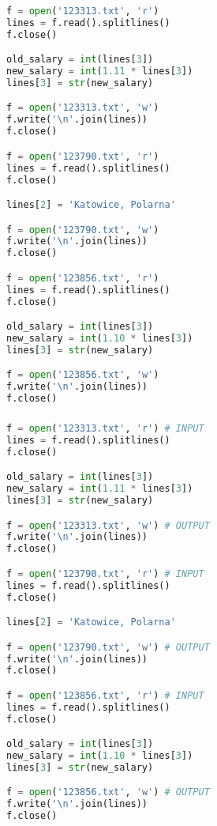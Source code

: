 \documentclass[aspectratio=169]{beamer}
\begin{document}
\begin{frame}[fragile]
\frametitle{}
\begin{lstlisting}[basicstyle=\tiny,language=python]
f = open('123313.txt', 'r')
lines = f.read().splitlines()
f.close()

old_salary = int(lines[3])
new_salary = int(1.11 * lines[3])
lines[3] = str(new_salary)

f = open('123313.txt', 'w')
f.write('\n'.join(lines))
f.close()

f = open('123790.txt', 'r')
lines = f.read().splitlines()
f.close()

lines[2] = 'Katowice, Polarna'

f = open('123790.txt', 'w')
f.write('\n'.join(lines))
f.close()

f = open('123856.txt', 'r')
lines = f.read().splitlines()
f.close()

old_salary = int(lines[3])
new_salary = int(1.10 * lines[3])
lines[3] = str(new_salary)

f = open('123856.txt', 'w')
f.write('\n'.join(lines))
f.close()
\end{lstlisting}
\end{frame}

\begin{frame}[fragile]
\frametitle{}
\begin{lstlisting}[basicstyle=\tiny,language=python]
f = open('123313.txt', 'r') # INPUT
lines = f.read().splitlines()
f.close()

old_salary = int(lines[3])
new_salary = int(1.11 * lines[3])
lines[3] = str(new_salary)

f = open('123313.txt', 'w') # OUTPUT
f.write('\n'.join(lines))
f.close()

f = open('123790.txt', 'r') # INPUT
lines = f.read().splitlines()
f.close()

lines[2] = 'Katowice, Polarna'

f = open('123790.txt', 'w') # OUTPUT
f.write('\n'.join(lines))
f.close()

f = open('123856.txt', 'r') # INPUT
lines = f.read().splitlines()
f.close()

old_salary = int(lines[3])
new_salary = int(1.10 * lines[3])
lines[3] = str(new_salary)

f = open('123856.txt', 'w') # OUTPUT
f.write('\n'.join(lines))
f.close()
\end{lstlisting}
\end{frame}
\end{document}
